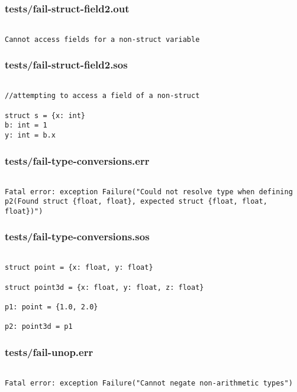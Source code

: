 \documentclass[main.tex]{subfiles}
\begin{document}
\subsubsection{tests/fail-struct-field2.out}

\begin{lstlisting}

Cannot access fields for a non-struct variable
\end{lstlisting}

\subsubsection{tests/fail-struct-field2.sos}

\begin{lstlisting}

//attempting to access a field of a non-struct

struct s = {x: int}
b: int = 1
y: int = b.x
\end{lstlisting}

\subsubsection{tests/fail-type-conversions.err}

\begin{lstlisting}

Fatal error: exception Failure("Could not resolve type when defining p2(Found struct {float, float}, expected struct {float, float, float})")
\end{lstlisting}

\subsubsection{tests/fail-type-conversions.sos}

\begin{lstlisting}

struct point = {x: float, y: float}

struct point3d = {x: float, y: float, z: float}

p1: point = {1.0, 2.0}

p2: point3d = p1
\end{lstlisting}

\subsubsection{tests/fail-unop.err}

\begin{lstlisting}

Fatal error: exception Failure("Cannot negate non-arithmetic types")
\end{lstlisting}
\end{document}
